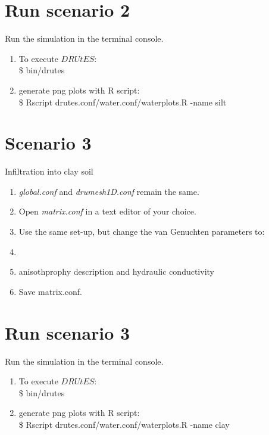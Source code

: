 \section*{Run scenario 2}
Run the simulation in the terminal console.
\begin{enumerate}
\item To execute $DRUtES$: \\
\$ bin/drutes
\item generate png plots with R script: \\
\$ Rscript drutes.conf/water.conf/waterplots.R -name silt
\end{enumerate}

\section*{Scenario 3}
Infiltration into clay soil
\begin{enumerate}
\item \emph{global.conf} and \emph{drumesh1D.conf} remain the same.
\item Open \emph{matrix.conf} in a text editor of your choice. 
\item Use the same set-up, but change the van Genuchten parameters to:
\item {}
\item anisothprophy description and hydraulic conductivity\\ 
\item Save matrix.conf.
\end{enumerate}

\section*{Run scenario 3}
Run the simulation in the terminal console.
\begin{enumerate}
\item To execute $DRUtES$: \\
\$ bin/drutes
\item generate png plots with R script: \\
\$ Rscript drutes.conf/water.conf/waterplots.R -name clay
\end{enumerate}

